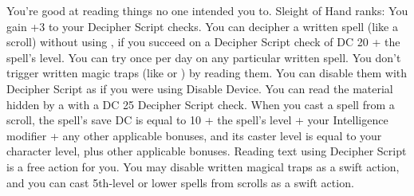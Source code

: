 \skillfeat
{You're good at reading things no one intended you to.}
{Sleight of Hand ranks:}
{You gain +3 to your Decipher Script checks.}
{You can decipher a written spell (like a scroll) without using , if you succeed on a Decipher Script check of DC 20 + the spell's level. You can try once per day on any particular written spell.}
{You don't trigger written magic traps (like  or ) by reading them. You can disable them with Decipher Script as if you were using Disable Device. You can read the material hidden by a  with a DC 25 Decipher Script check.}
{When you cast a spell from a scroll, the spell's save DC is equal to 10 + the spell's level + your Intelligence modifier + any other applicable bonuses, and its caster level is equal to your character level, plus other applicable bonuses.}
{Reading text using Decipher Script is a free action for you. You may disable written magical traps as a swift action, and you can cast 5th-level or lower spells from scrolls as a swift action.}